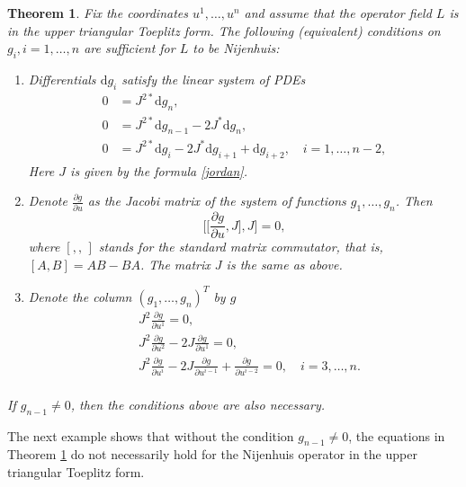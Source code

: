 \documentclass[12pt]{article}
\newtheorem{Theorem}{Theorem}
\theoremstyle{remark}
\newcommand{\ddd}{\mathrm{d}}
\newcommand{\pd}[2]{\frac{\partial#1}{\partial#2}}
\begin{document}
\begin{Theorem}\label{t1}
Fix the coordinates $u^1, \dots, u^n$ and assume that the operator field $L$ is in the upper triangular Toeplitz form. The following (equivalent) conditions on $g_i, i = 1, \dots, n$ are sufficient for $L$ to be Nijenhuis:
\begin{enumerate}
    \item Differentials $\ddd g_i$ satisfy the linear system of PDEs
    \begin{equation}\label{eq1}
    \begin{aligned}
    0 & = J^{2*} \ddd g_n, \\
    0 & = J^{2*} \ddd g_{n - 1} - 2 J^* \ddd g_n, \\
    0 & = J^{2*} \ddd g_i - 2 J^* \ddd g_{i + 1} + \ddd g_{i + 2}, \quad i = 1, \dots, n - 2,
    \end{aligned}    
    \end{equation}
    Here $J$ is given by the formula \eqref{jordan}.
    \item Denote $\pd{g}{u}$ as the Jacobi matrix of the system of functions $g_1, \dots, g_n$. Then
    \begin{equation}\label{eq2}
    \Big[\Big[\pd{g}{u}, J\Big], J\Big] = 0,   
    \end{equation}
    where $[, , \,]$ stands for the standard matrix commutator, that is, $[A, B] = AB - BA$. The matrix $J$ is the same as above.
    \item Denote the column $(g_1, \dots, g_n)^T$ by $g$
    \begin{equation}\label{eq3}
        \begin{aligned}
        & J^2 \pd{g}{u^1} = 0, \\
        & J^2 \pd{g}{u^2} - 2 J \pd{g}{u^1} = 0, \\
        & J^2 \pd{g}{u^{i}} - 2 J \pd{g}{u^{i - 1}} + \pd{g}{u^{i - 2}} = 0, \quad i = 3, \dots, n. \\
\end{aligned}
    \end{equation}
\end{enumerate}
If $g_{n - 1} \neq 0$, then the conditions above are also necessary.
\end{Theorem}

The next example shows that without the condition $g_{n - 1} \neq 0$, the equations in Theorem \ref{t1} do not necessarily hold for the Nijenhuis operator in the upper triangular Toeplitz form.
\end{document}
